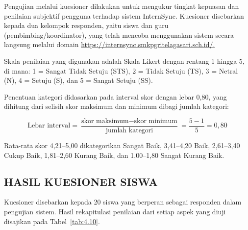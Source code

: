 Pengujian melalui kuesioner dilakukan untuk mengukur tingkat kepuasan dan penilaian subjektif pengguna terhadap sistem InternSync. Kuesioner disebarkan kepada dua kelompok responden, yaitu siswa dan guru (pembimbing/koordinator), yang telah mencoba menggunakan sistem secara langsung melalui domain \url{https://internsync.smkpgritelagasari.sch.id/.}

Skala penilaian yang digunakan adalah Skala Likert dengan rentang 1 hingga 5, di mana: 1 = Sangat Tidak Setuju (STS), 2 = Tidak Setuju (TS), 3 = Netral (N), 4 = Setuju (S), dan 5 = Sangat Setuju (SS).

Penentuan kategori didasarkan pada interval skor dengan lebar 0,80, yang dihitung dari selisih skor maksimum dan minimum dibagi jumlah kategori:

\begin{equation*}
\text{Lebar interval} = \frac{\text{skor maksimum} - \text{skor minimum}}{\text{jumlah kategori}} = \frac{5 - 1}{5} = 0{,}80
\end{equation*}

Rata-rata skor 4,21–5,00 dikategorikan Sangat Baik, 3,41–4,20 Baik, 2,61–3,40 Cukup Baik, 1,81–2,60 Kurang Baik, dan 1,00–1,80 Sangat Kurang Baik.

\subsection{HASIL KUESIONER SISWA}

Kuesioner disebarkan kepada 20 siswa yang berperan sebagai responden dalam pengujian sistem. Hasil rekapitulasi penilaian dari setiap aspek yang diuji disajikan pada Tabel~\ref{tab:4.10}.

